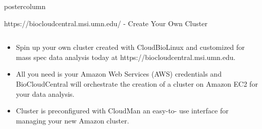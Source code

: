 \documentclass[final]{beamer}
\begin{document}
\begin{frame}
\begin{columns}
\begin{column}{.5\textwidth}
\begin{beamercolorbox}[center,wd=\textwidth]{postercolumn}
\begin{minipage}[T]{.95\textwidth}
{\begin{block}{https://biocloudcentral.msi.umn.edu/ - Create Your Own Cluster}
\begin{columns}
\begin{column}{.60\textwidth}
\begin{itemize}
                    \item Spin up your own cluster created with CloudBioLinux
                    and customized for mass spec data analysis today at
                    https://biocloudcentral.msi.umn.edu.

                    \item All you need is your Amazon Web Services (AWS)
                    credentials and BioCloudCentral will orchestrate the creation
                    of a cluster on Amazon EC2 for your data analysis.

                    \item Cluster is preconfigured with CloudMan an easy-to-
                    use interface for managing your new Amazon cluster.

                  \end{itemize}
                \end{column}

              \end{columns}

            \end{block}

            \vfill

            \begin{columns}
              \begin{column}{.49\textwidth}
            

\end{column}
\end{columns}}
\end{minipage}
\end{beamercolorbox}
\end{column}
\end{columns}
\end{frame}
\end{document}
